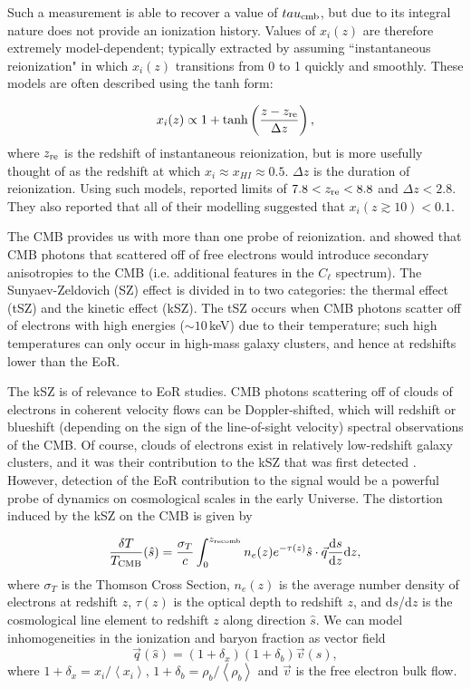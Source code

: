 Such a measurement is able to recover a value of $tau_{\rm cmb}$, but due to its integral nature does not provide an ionization history. Values of $x_i(z)$ are therefore extremely model-dependent; typically extracted by assuming ``instantaneous reionization" in which $x_i(z)$ transitions from 0 to 1 quickly and smoothly. These models are often described using the tanh form:

\begin{equation}
x_i(z) \propto 1+\tanh\left(\frac{z - z_{\rm re}}{\Delta z}\right),
\end{equation}
where $z_{\rm re}$ is the redshift of instantaneous reionization, but is more usefully thought of as the redshift at which $x_i \approx x_{HI} \approx 0.5$. $\Delta z$ is the duration of reionization. Using such models, \cite{Planck.16.reionization} reported limits of  $7.8 < z_{\rm re} < 8.8$ and $\Delta z < 2.8$. They also reported that all of their modelling suggested that $x_i(z\gtrsim10)<0.1$.

The CMB provides us with more than one probe of reionization. \cite{Zeldovich.69} and \cite{Sunyaev.70} showed that CMB photons that scattered off of free electrons would introduce secondary anisotropies to the CMB (i.e. additional features in the $C_{\ell}$ spectrum). The Sunyaev-Zeldovich (SZ) effect is divided in to two categories: the thermal effect (tSZ) and the kinetic effect (kSZ). The tSZ occurs when CMB photons scatter off of electrons with high energies ($\sim 10$\,keV) due to their temperature; such high temperatures can only occur in high-mass galaxy clusters, and hence at redshifts lower than the EoR. 

The kSZ is of relevance to EoR studies. CMB photons scattering off of clouds of electrons in coherent velocity flows can be Doppler-shifted, which will redshift or blueshift (depending on the sign of the line-of-sight velocity) spectral observations of the CMB. Of course, clouds of electrons exist in relatively low-redshift galaxy clusters, and it was their contribution to the kSZ that was first detected \citep{Hand.12}. However, detection of the EoR contribution to the signal would be a powerful probe of dynamics on cosmological scales in the early Universe. The distortion induced by the kSZ on the CMB is given by

\begin{equation}
\frac{\delta T}{T_{\rm CMB}}(\hat{s}) = \frac{\sigma_T}{c} \int_0^{z_{\rm recomb}} n_e(z)e^{-\tau(z)} \hat{s}\cdot\vec{q} \frac{{\rm d}s}{{\rm d}z}{\rm d}z,
\end{equation}
where $\sigma_T$ is the Thomson Cross Section, $n_e(z)$ is the average number density of electrons at redshift $z$, $\tau(z)$ is the optical depth to redshift $z$, and d$s$/d$z$ is the cosmological line element to redshift $z$ along direction $\hat{s}$. We can model inhomogeneities in the ionization and baryon fraction as vector field
\begin{equation}
\vec{q}(\hat{s}) = (1+\delta_x)(1+\delta_b)\vec{v}(\hat{s}),
\end{equation}
where $1+\delta_x = x_i/\left\langle x_i \right\rangle$, $1+\delta_b= \rho_b/\left\langle \rho_b \right\rangle$ and $\vec{v}$ is the free electron bulk flow.

